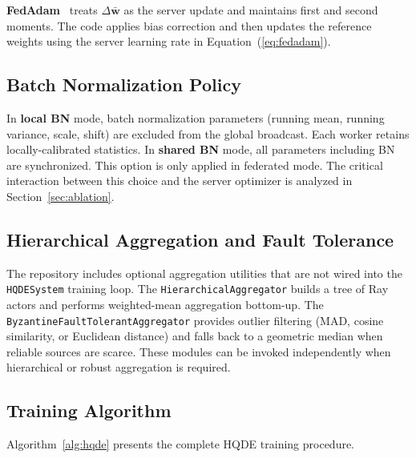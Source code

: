 \documentclass[journal,twoside]{IEEEtran}
\newcommand{\hqde}{\mbox{HQDE}\xspace}
\begin{document}
\textbf{FedAdam}~\cite{reddi2021fedadam} treats $\Delta\bar{\mathbf{w}}$
as the server update and maintains first and second moments. The code
applies bias correction and then updates the reference weights using the
server learning rate in Equation~(\ref{eq:fedadam}).

\subsection{Batch Normalization Policy}

In \textbf{local BN} mode, batch normalization parameters (running
mean, running variance, scale, shift) are excluded from the global
broadcast. Each worker retains locally-calibrated statistics. In
\textbf{shared BN} mode, all parameters including BN are synchronized.
This option is only applied in federated mode.
The critical interaction between this choice and the server optimizer is
analyzed in Section~\ref{sec:ablation}.

\subsection{Hierarchical Aggregation and Fault Tolerance}

The repository includes optional aggregation utilities that are not wired
into the \texttt{HQDESystem} training loop. The
\texttt{HierarchicalAggregator} builds a tree of Ray actors and performs
weighted-mean aggregation bottom-up. The
\texttt{ByzantineFaultTolerantAggregator} provides outlier filtering
(MAD, cosine similarity, or Euclidean distance) and falls back to a
geometric median when reliable sources are scarce. These modules can be
invoked independently when hierarchical or robust aggregation is
required.

\subsection{Training Algorithm}

Algorithm~\ref{alg:hqde} presents the complete \hqde{} training
procedure.
\end{document}
